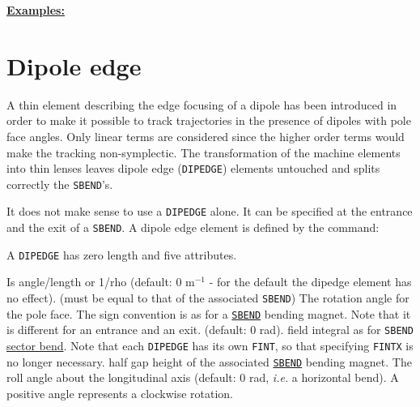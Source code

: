 \textbf{\underline {Examples:}}



\section{Dipole edge}
\label{sec:dipedge}

A thin element describing the edge focusing of a dipole has been
introduced in order to make it possible to track trajectories in the
presence of dipoles with pole face angles. Only linear terms are
considered since the higher order terms would make the tracking
non-symplectic. The transformation of the machine elements into thin
lenses leaves dipole edge (\texttt{DIPEDGE}) elements untouched and splits 
correctly the \texttt{SBEND}'s.  

It does not make sense to use a \texttt{DIPEDGE} alone. 
It can be specified at the entrance and the exit of a \texttt{SBEND}. 
A dipole edge element is defined by the command:  

A \texttt{DIPEDGE} has zero length and five attributes. 
\begin{madlist}
    Is angle/length or 1/rho (default: 0 m$^{-1}$ - for the
     default the dipedge element has no effect). (must be equal to that
     of the associated \texttt{SBEND})  
    The rotation angle for the pole face. The sign convention is
     as for a \hyperref[bend-sbend]{\texttt{SBEND}} bending magnet. Note that it is
     different for an entrance and an exit. (default: 0 rad).  
    field integral as for \texttt{SBEND}
     \hyperref[F-SBND]{sector bend}. Note that each
     \texttt{DIPEDGE} has its own \texttt{FINT}, so that specifying
     \texttt{FINTX} is no longer necessary.   
    half gap height of the associated \hyperref[bend-sbend]{\texttt{SBEND}}
     bending magnet.   
    The roll angle about the longitudinal axis (default: 0
     rad, \textsl{i.e.} a horizontal bend). A positive angle represents a
     clockwise rotation.  
\end{madlist}



